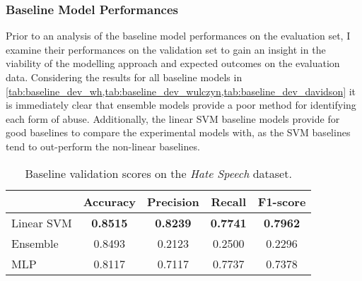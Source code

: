 \begin{table}[h]
  \centering
  \caption{Best hyper parameters for non-linear single task model for each main task dataset.}
  \label{tab:mlp_singletask_params}
\end{table}

\subsubsection{Baseline Model Performances}
Prior to an analysis of the baseline model performances on the evaluation set, I examine their performances on the validation set to gain an insight in the viability of the modelling approach and expected outcomes on the evaluation data.
Considering the results for all baseline models in \cref{tab:baseline_dev_wh,tab:baseline_dev_wulczyn,tab:baseline_dev_davidson} it is immediately clear that ensemble models provide a poor method for identifying each form of abuse.
Additionally, the linear SVM baseline models provide for good baselines to compare the experimental models with, as the SVM baselines tend to out-perform the non-linear baselines.

\begin{table}[h]
  \centering
  \begin{tabular}{l|cccc}
               & Accuracy        & Precision       & Recall          & F1-score        \\ \hline
    Linear SVM & \textbf{0.8515} & \textbf{0.8239} & \textbf{0.7741} & \textbf{0.7962} \\
    Ensemble   & 0.8493          & 0.2123          & 0.2500          & 0.2296          \\
    MLP        & 0.8117          & 0.7117          & 0.7737          & 0.7378
  \end{tabular}
  \caption{Baseline validation scores on the \textit{Hate Speech} dataset.}
  \label{tab:baseline_dev_wh}
\end{table}

